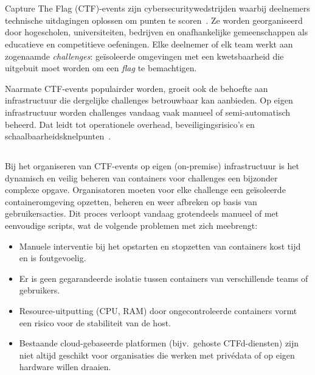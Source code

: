 
\chapter{}%
\label{ch:inleiding}

Capture The Flag (CTF)-events zijn cybersecuritywedstrijden waarbij deelnemers technische uitdagingen oplossen om punten te scoren~\autocite{Innovirtuoso2025}. Ze worden georganiseerd door hogescholen, universiteiten, bedrijven en onafhankelijke gemeenschappen als educatieve en competitieve oefeningen. Elke deelnemer of elk team werkt aan zogenaamde \textit{challenges}: geïsoleerde omgevingen met een kwetsbaarheid die uitgebuit moet worden om een \textit{flag} te bemachtigen.

Naarmate CTF-events populairder worden, groeit ook de behoefte aan infrastructuur die dergelijke challenges betrouwbaar kan aanbieden. Op eigen infrastructuur worden challenges vandaag vaak manueel of semi-automatisch beheerd. Dat leidt tot operationele overhead, beveiligingsrisico's en schaalbaarheidsknelpunten~\autocite{Singier2025}.

\section{}%
\label{sec:probleemstelling}

Bij het organiseren van CTF-events op eigen (on-premise) infrastructuur is het dynamisch en veilig beheren van containers voor challenges een bijzonder complexe opgave. Organisatoren moeten voor elke challenge een geïsoleerde containeromgeving opzetten, beheren en weer afbreken op basis van gebruikersacties. Dit proces verloopt vandaag grotendeels manueel of met eenvoudige scripts, wat de volgende problemen met zich meebrengt:

\begin{itemize}
  \item Manuele interventie bij het opstarten en stopzetten van containers kost tijd en is foutgevoelig.
  \item Er is geen gegarandeerde isolatie tussen containers van verschillende teams of gebruikers.
  \item Resource-uitputting (CPU, RAM) door ongecontroleerde containers vormt een risico voor de stabiliteit van de host.
  \item Bestaande cloud-gebaseerde platformen (bijv.\ gehoste CTFd-diensten) zijn niet altijd geschikt voor organisaties die werken met privédata of op eigen hardware willen draaien.
\end{itemize}

